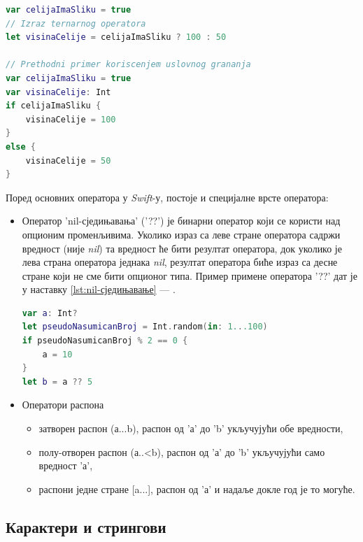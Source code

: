 \documentclass[12pt,oneside]{memoir}
\begin{document}
\begin{lstlisting}[caption=\textit{{Тернарни оператор}}, label={lst:Тернарни оператор}, language=Swift, frame=single]
var celijaImaSliku = true
// Izraz ternarnog operatora
let visinaCelije = celijaImaSliku ? 100 : 50

// Prethodni primer koriscenjem uslovnog grananja
var celijaImaSliku = true
var visinaCelije: Int
if celijaImaSliku {
    visinaCelije = 100
}
else {
    visinaCelije = 50
}
\end{lstlisting}

\indent Поред основних оператора у \textit{Swift}-у, постоје и специјалне врсте оператора:

\begin{itemize}
    \item Оператор 'nil-сједињавања' ('??') је бинарни оператор који се користи над опционим променљивима. Уколико израз са леве стране оператора садржи вредност (није \textit{nil}) та вредност ће бити резултат оператора, док уколико је лева страна оператора једнака  \textit{nil}, резултат оператора биће израз са десне стране који не сме бити опционог типа. Пример примене оператора '??' дат је у наставку \ref{lst:nil-сједињавање} --- .
    
\begin{lstlisting}[caption=\textit{{nil-сједињавање}}, label={lst:nil-сједињавање}, language=Swift, frame=single]
var a: Int?
let pseudoNasumicanBroj = Int.random(in: 1...100)
if pseudoNasumicanBroj % 2 == 0 {
    a = 10
}
let b = a ?? 5
\end{lstlisting}
    
    \item Оператори распона
    
\begin{itemize}
    \item затворен распон (а...b), распон од 'а' до 'b' укључујући обе вредности,
    \item полу-отворен распон (а..<b), распон од 'а' до 'b' укључујући само вредност 'а',
    \item распони једне стране [a...], распон од 'а' и надаље докле год је то могуће.
\end{itemize}

\end{itemize}

\subsection{Карактери и стрингови}
\end{document}
